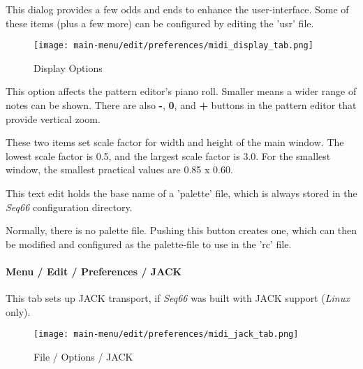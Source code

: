    This dialog provides a few odds and ends to enhance the user-interface.
   Some of these items (plus a few more) can be configured by editing the 'usr'
   file.

\begin{figure}[H]
   \centering 
   \texttt{[image: main-menu/edit/preferences/midi\_display\_tab.png]}
   \caption{Display Options}
   \label{fig:midi_display_tab}
\end{figure}

   \setcounter{ItemCounter}{0}      %

   This option affects the pattern editor's piano roll.  Smaller means a wider
   range of notes can be shown.  There are also
   \textbf{-},
   \textbf{0}, and
   \textbf{+} buttons in the pattern editor that provide
   vertical zoom.

   These two items set scale factor for width and height of the main window.
   The lowest scale factor is 0.5, and the largest scale factor is 3.0.
   For the smallest window, the smallest practical values are 0.85 x 0.60.

   This text edit holds the base name of a 'palette' file, which is always
   stored in the \textsl{Seq66} configuration directory.

   Normally, there is no palette file.  Pushing this button creates one, which
   can then be modified and configured as the palette-file to use in the 'rc'
   file.
 
\paragraph{Menu / Edit / Preferences / JACK}
\label{paragraph:menu_edit_preferences_jack}

   This tab sets up JACK transport, if \textsl{Seq66}
   was built with JACK support (\textsl{Linux} only).

\begin{figure}[H]
   \centering 
   \texttt{[image: main-menu/edit/preferences/midi\_jack\_tab.png]}
   \caption{File / Options / JACK}
   \label{fig:midi_jack_tab}
\end{figure}

